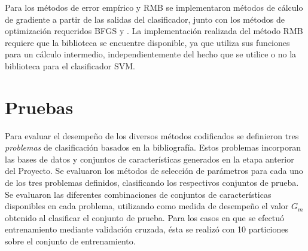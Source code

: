 \documentclass[12pt,bibliography=oldstyle,DIV=12,parskip=half-,titlepage]{scrartcl}
\begin{document}
Para los métodos de error empírico y RMB se implementaron métodos de
cálculo de gradiente a partir de las salidas del clasificador, junto
con los métodos de optimización requeridos BFGS \cite{nocedal} y
 \cite{linesearch}.
La implementación realizada del método RMB requiere que la biblioteca
 se encuentre disponible, ya que utiliza sus funciones para
un cálculo intermedio, independientemente del hecho que se utilice o no
la biblioteca para el clasificador SVM.
%
%
\section{Pruebas}
%
Para evaluar el desempeño de los diversos métodos codificados se
definieron tres \emph{problemas} de clasificación basados en la
bibliografía. Estos problemas incorporan las bases de datos y
conjuntos de características generados en la etapa anterior del
Proyecto.  Se evaluaron los métodos de selección de parámetros para
cada uno de los tres problemas definidos, clasificando los respectivos
conjuntos de prueba. Se evaluaron las diferentes combinaciones de
conjuntos de características disponibles en cada problema, utilizando
como medida de desempeño el valor $G_m$ obtenido al clasificar el
conjunto de prueba.  Para los casos en que se efectuó entrenamiento
mediante validación cruzada, ésta se realizó con 10 particiones sobre
el conjunto de entrenamiento.
%
%
\end{document}
